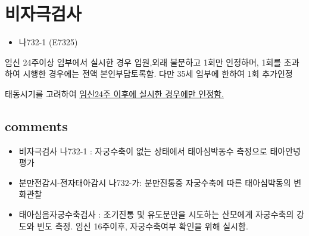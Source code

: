 \section{비자극검사}
\begin{paracol}{2}
\setlength{\columnseprule}{0.4pt}
\setlength{\columnsep}{2em}
\begin{leftcolumn}
\begin{commentbox}{}
\begin{itemize}\tightlist
\item[\dsmedical] 나732-1 (E7325) 
\end{itemize}
\end{commentbox}

\end{leftcolumn}

\begin{rightcolumn}
임신 24주이상 임부에서 실시한 경우 입원,외래 불문하고 1회만 인정하며, 1회를 초과하여 시행한 경우에는 전액 본인부담토록함. 다만 35세 임부에 한하여 1회 추가인정\par
{} 태동시기를 고려하여 \uline{임신24주 이후에 실시한 경우에만 인정함.}
\end{rightcolumn}
\end{paracol} 
\subsection{comments}
\begin{itemize}\tightlist
\item 비자극검사 나732-1 : 자궁수축이 없는 상태에서 태아심박동수 측정으로 태아안녕평가
\item 분만전감시-전자태아감시 나732-가: 분만진통중 자궁수축에 따른 태아심박동의 변화관찰
\item 태아심음자궁수축검사 : 조기진통 및 유도분만을 시도하는 산모에게 자궁수축의 강도와 빈도 측정. 임신 16주이후, 자궁수축여부 확인을 위해 실시함.
\end{itemize}